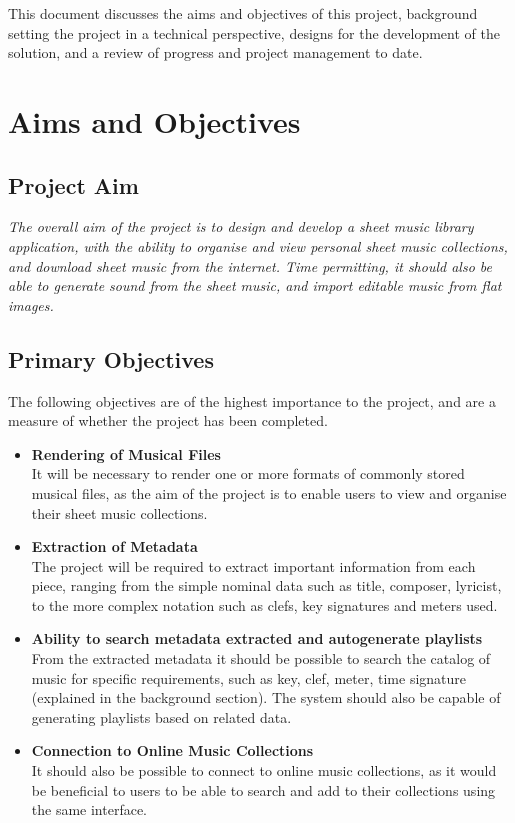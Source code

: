 This document discusses the aims and objectives of this project, background setting the project in a technical perspective, designs for the development of the solution, and a review of progress and project management to date. 
\pagebreak
\section{Aims and Objectives}
\subsection{Project Aim}
\begin{center}
\textit{The overall aim of the project is to design and develop a sheet music library application, with the ability to organise and view personal sheet music collections, and download sheet music from the internet. Time permitting, it should also be able to generate sound from the sheet music, and import editable music from flat images.}
\end{center}
\subsection{Primary Objectives}
The following objectives are of the highest importance to the project, and are a measure of whether the project has been completed.
\begin{itemize}
    \item \textbf{Rendering of Musical Files}\\
    It will be necessary to render one or more formats of commonly stored musical files, as the aim of the project is to enable users to view and organise their sheet music collections.
    \item \textbf{Extraction of Metadata}\\
    The project will be required to extract important information from each piece, ranging from the simple nominal data such as title, composer, lyricist, to the more complex notation such as clefs, key signatures and meters used. 
    \item \textbf{Ability to search metadata extracted and autogenerate playlists}\\ From the extracted metadata it should be possible to search the catalog of music for specific requirements, such as key, clef, meter, time signature (explained in the background section). The system should also be capable of generating playlists based on related data.
    \item \textbf{Connection to Online Music Collections}\\
    It should also be possible to connect to online music collections, as it would be beneficial to users to be able to search and add to their collections using the same interface.

\end{itemize}
